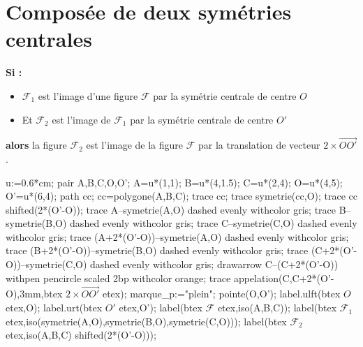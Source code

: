 \section{Composée de deux symétries centrales}
\begin{propriete}[\admise]
    {\bfseries Si : }
    \begin{itemize}
        \item ${\mathcal F}_1$ est l'image d'une figure $\mathcal F$ par la symétrie centrale de centre $O$
        \item Et ${\mathcal F}_2$ est l'image de ${\mathcal F}_1$ par la symétrie centrale de centre $O'$
    \end{itemize}
    {\bfseries alors} la figure ${\mathcal F}_2$ est l'image de la figure $\mathcal F$ par la translation de vecteur $2\times\overrightarrow{OO'}$.

    \smallskip
    \begin{center}
        \begin{Geometrie}[CoinBG={(0,-u)},CoinHD={(10u,10u)}]
            u:=0.6*cm;
            pair A,B,C,O,O';
            A=u*(1,1);
            B=u*(4,1.5);
            C=u*(2,4);
            O=u*(4,5);
            O'=u*(6,4);
            path cc;        
            cc=polygone(A,B,C);
            trace cc;
            trace symetrie(cc,O);
            trace cc shifted(2*(O'-O));
            trace A--symetrie(A,O) dashed evenly withcolor gris;
            trace B--symetrie(B,O) dashed evenly withcolor gris;
            trace C--symetrie(C,O) dashed evenly withcolor gris;
            trace (A+2*(O'-O))--symetrie(A,O) dashed evenly withcolor gris;
            trace (B+2*(O'-O))--symetrie(B,O) dashed evenly withcolor gris;
            trace (C+2*(O'-O))--symetrie(C,O) dashed evenly withcolor gris;
            drawarrow C--(C+2*(O'-O)) withpen pencircle scaled 2bp withcolor orange;
            trace appelation(C,C+2*(O'-O),3mm,btex $2\times\overrightarrow{OO'}$ etex);
            marque_p:="plein";
            pointe(O,O');
            label.ulft(btex $O$ etex,O);
            label.urt(btex $O'$ etex,O');
            label(btex $\mathcal F$ etex,iso(A,B,C));
            label(btex ${\mathcal F}_1$ etex,iso(symetrie(A,O),symetrie(B,O),symetrie(C,O)));
            label(btex ${\mathcal F}_2$ etex,iso(A,B,C) shifted(2*(O'-O)));
        \end{Geometrie}
    \end{center}
\end{propriete}